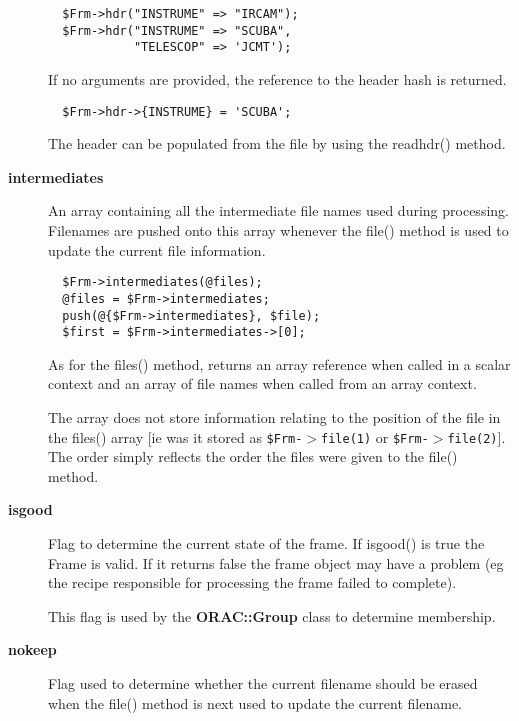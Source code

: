 \begin{description}
\begin{verbatim}
  $Frm->hdr("INSTRUME" => "IRCAM");
  $Frm->hdr("INSTRUME" => "SCUBA", 
            "TELESCOP" => 'JCMT');
\end{verbatim}


If no arguments are provided, the reference to the header hash
is returned.

\begin{verbatim}
  $Frm->hdr->{INSTRUME} = 'SCUBA';
\end{verbatim}


The header can be populated from the file by using the readhdr()
method.

\item[\textbf{intermediates}] \mbox{}

An array containing all the intermediate file names used
during processing. Filenames are pushed onto this array
whenever the file() method is used to update the current
file information.

\begin{verbatim}
  $Frm->intermediates(@files);
  @files = $Frm->intermediates;
  push(@{$Frm->intermediates}, $file);
  $first = $Frm->intermediates->[0];
\end{verbatim}


As for the files() method, returns an array reference when
called in a scalar context and an array of file names when
called from an array context.



The array does not store information relating to the position of the
file in the files() array [ie was it stored as \texttt{\$Frm-$>$file(1)} or
\texttt{\$Frm-$>$file(2)}]. The order simply reflects the order the files
were given to the file() method.

\item[\textbf{isgood}] \mbox{}

Flag to determine the current state of the frame. If isgood()
is true the Frame is valid. If it returns false the frame
object may have a problem (eg the recipe responsible for 
processing the frame failed to complete).



This flag is used by the \textbf{ORAC::Group} class to determine
membership.

\item[\textbf{nokeep}] \mbox{}

Flag used to determine whether the current filename should be
erased when the file() method is next used to update the current
filename.


\end{description}
